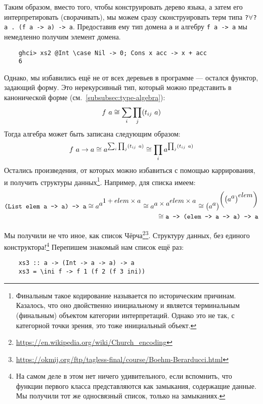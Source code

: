 Таким образом, вместо того, чтобы конструировать дерево языка, а затем его интерпретировать (сворачивать), мы можем сразу сконструировать терм типа \texttt{?$\forall$?a . (f a -> a) -> a}.
Предоставив ему тип домена \texttt{a} и алгебру \texttt{f a -> a} мы немедленно получим элемент домена.

\begin{verbatim}
    ghci> xs2 @Int \case Nil -> 0; Cons x acc -> x + acc
    6
\end{verbatim}

Однако, мы избавились ещё не от всех деревьев в программе --- остался функтор, задающий форму.
Это нерекурсивный тип, который можно представить в канонической форме (см.~\ref{subsubsec:type-algebra}):
\[
    f~ a \cong \sum_{i}\prod_{j} (t_{ij}~ a)
\]
Тогда алгебра может быть записана следующим образом:
\[
    f~ a\to a\cong a^{\sum_{i}\prod_{j} (t_{ij}~ a)} \cong \prod_{i}a^{\prod_{j} (t_{ij}~ a)}
\]
Остались произведения, от которых можно избавиться с помощью каррирования, и получить  структуры данных\footnote{Финальным такое кодирование называется по историческим причинам. Казалось, что оно двойственно инициальному и является терминальным (финальным) объектом категории интерпретаций. Однако это не так, с категорной точки зрения, это тоже инициальный объект.}.
Например, для списка имеем:
\begin{align*}
    \text{\texttt{(List elem a -> a) -> a}}
    \cong a^{\displaystyle a^{\displaystyle 1 + elem\times a}}
    \cong a^{\displaystyle a\times a^{\displaystyle elem\times a}}
    \cong \left( a^{\displaystyle a} \right)^{\displaystyle \left(\left( a^{\displaystyle a}\right)^{\displaystyle elem}\right)} \\
    \cong \text{\texttt{a -> (elem -> a -> a) -> a}}
\end{align*}

Мы получили не что иное, как список Чёрча\footnote{\url{https://en.wikipedia.org/wiki/Church_encoding}}\footnote{\url{https://okmij.org/ftp/tagless-final/course/Boehm-Berarducci.html}}.
Структуру данных, без единого конструктора!\footnote{На самом деле в этом нет ничего удивительного, если вспомнить, что функции первого класса представляются как замыкания, содержащие данные. Мы получили тот же односвязный список, только на замыканиях.}
Перепишем знакомый нам список ещё раз:
\begin{verbatim}
    xs3 :: a -> (Int -> a -> a) -> a
    xs3 = \ini f -> f 1 (f 2 (f 3 ini))
\end{verbatim}

